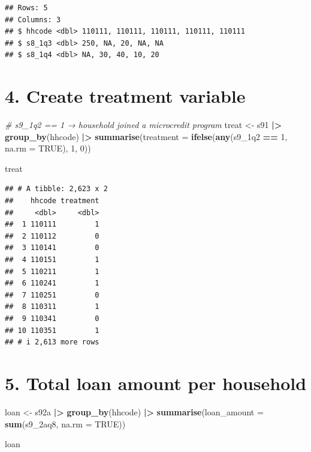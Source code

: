 \documentclass[
]{article}
\newenvironment{Shaded}{\begin{snugshade}}{\end{snugshade}}
\newcommand{\AttributeTok}[1]{\textcolor[rgb]{0.13,0.29,0.53}{#1}}
\newcommand{\CommentTok}[1]{\textcolor[rgb]{0.56,0.35,0.01}{\textit{#1}}}
\newcommand{\ConstantTok}[1]{\textcolor[rgb]{0.56,0.35,0.01}{#1}}
\newcommand{\DecValTok}[1]{\textcolor[rgb]{0.00,0.00,0.81}{#1}}
\newcommand{\FunctionTok}[1]{\textcolor[rgb]{0.13,0.29,0.53}{\textbf{#1}}}
\newcommand{\NormalTok}[1]{#1}
\newcommand{\OtherTok}[1]{\textcolor[rgb]{0.56,0.35,0.01}{#1}}
\newcommand{\SpecialCharTok}[1]{\textcolor[rgb]{0.81,0.36,0.00}{\textbf{#1}}}
\begin{document}
\begin{verbatim}
## Rows: 5
## Columns: 3
## $ hhcode <dbl> 110111, 110111, 110111, 110111, 110111
## $ s8_1q3 <dbl> 250, NA, 20, NA, NA
## $ s8_1q4 <dbl> NA, 30, 40, 10, 20
\end{verbatim}

\section{4. Create treatment variable}\label{create-treatment-variable}

\begin{Shaded}
\begin{Highlighting}[]
\CommentTok{\# s9\_1q2 == 1 → household joined a microcredit program}
\NormalTok{treat }\OtherTok{\textless{}{-}}\NormalTok{ s91 }\SpecialCharTok{|\textgreater{}}
  \FunctionTok{group\_by}\NormalTok{(hhcode) }\SpecialCharTok{|\textgreater{}}
  \FunctionTok{summarise}\NormalTok{(}\AttributeTok{treatment =} \FunctionTok{ifelse}\NormalTok{(}\FunctionTok{any}\NormalTok{(s9\_1q2 }\SpecialCharTok{==} \DecValTok{1}\NormalTok{, }\AttributeTok{na.rm =} \ConstantTok{TRUE}\NormalTok{), }\DecValTok{1}\NormalTok{, }\DecValTok{0}\NormalTok{))}

\NormalTok{treat}
\end{Highlighting}
\end{Shaded}

\begin{verbatim}
## # A tibble: 2,623 x 2
##    hhcode treatment
##     <dbl>     <dbl>
##  1 110111         1
##  2 110112         0
##  3 110141         0
##  4 110151         1
##  5 110211         1
##  6 110241         1
##  7 110251         0
##  8 110311         1
##  9 110341         0
## 10 110351         1
## # i 2,613 more rows
\end{verbatim}

\section{5. Total loan amount per
household}\label{total-loan-amount-per-household}

\begin{Shaded}
\begin{Highlighting}[]
\NormalTok{loan }\OtherTok{\textless{}{-}}\NormalTok{ s92a }\SpecialCharTok{|\textgreater{}}
  \FunctionTok{group\_by}\NormalTok{(hhcode) }\SpecialCharTok{|\textgreater{}}
  \FunctionTok{summarise}\NormalTok{(}\AttributeTok{loan\_amount =} \FunctionTok{sum}\NormalTok{(s9\_2aq8, }\AttributeTok{na.rm =} \ConstantTok{TRUE}\NormalTok{))}

\NormalTok{loan}
\end{Highlighting}
\end{Shaded}
\end{document}
